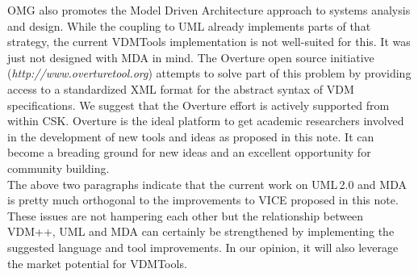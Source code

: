 OMG also promotes the Model Driven Architecture approach to systems
analysis and design. While the coupling to UML already implements parts
of that strategy, the current VDMTools implementation is not well-suited
for this. It was just not designed with MDA in mind. The Overture open
source initiative (\textit{http://www.overturetool.org}) attempts to
solve part of this problem by providing access to a standardized XML
format for the abstract syntax of VDM specifications. We suggest that
the Overture effort is actively supported from within CSK. Overture is
the ideal platform to get academic researchers involved in the
development of new tools and ideas as proposed in this note. It can
become a breading ground for new ideas and an excellent opportunity
for community building. \\

The above two paragraphs indicate that the current work on UML\,2.0
and MDA is pretty much orthogonal to the improvements to VICE proposed
in this note. These issues are not hampering each other but the
relationship between VDM++, UML and MDA can certainly be strengthened
by implementing the suggested language and tool improvements. In our
opinion, it will also leverage the market potential for VDMTools.

